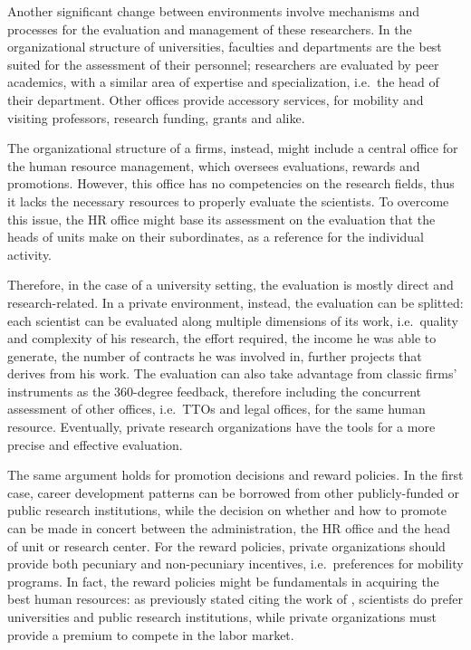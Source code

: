 Another significant change between environments involve mechanisms and processes for the evaluation and management of these researchers. In the organizational structure of universities, faculties and departments are the best suited for the assessment of their personnel; researchers are evaluated by peer academics, with a similar area of expertise and specialization, i.e.\ the head of their department. Other offices provide accessory services, for mobility and visiting professors, research funding, grants and alike.

The organizational structure of a firms, instead, might include a central office for the human resource management, which oversees evaluations, rewards and promotions. However, this office has no competencies on the research fields, thus it lacks the necessary resources to properly evaluate the scientists. To overcome this issue, the HR office might base its assessment on the evaluation that the heads of units make on their subordinates, as a reference for the individual activity.

Therefore, in the case of a university setting, the evaluation is mostly direct and research-related. In a private environment, instead, the evaluation can be splitted: each scientist can be evaluated along multiple dimensions of its work, i.e.\ quality and complexity of his research, the effort required, the income he was able to generate, the number of contracts he was involved in, further projects that derives from his work. The evaluation can also take advantage from classic firms' instruments as the 360-degree feedback, therefore including the concurrent assessment of other offices, i.e.\ TTOs and legal offices, for the same human resource. Eventually, private research organizations have the tools for a more precise and effective evaluation.

The same argument holds for promotion decisions and reward policies. In the first case, career development patterns can be borrowed from other publicly-funded or public research institutions, while the decision on whether and how to promote can be made in concert between the administration, the HR office and the head of unit or research center. For the reward policies, private organizations should provide both pecuniary and non-pecuniary incentives, i.e.\ preferences for mobility programs. In fact, the reward policies might be fundamentals in acquiring the best human resources: as previously stated citing the work of \citet{Stern2004}, scientists do prefer universities and public research institutions, while private organizations must provide a premium to compete in the labor market.

